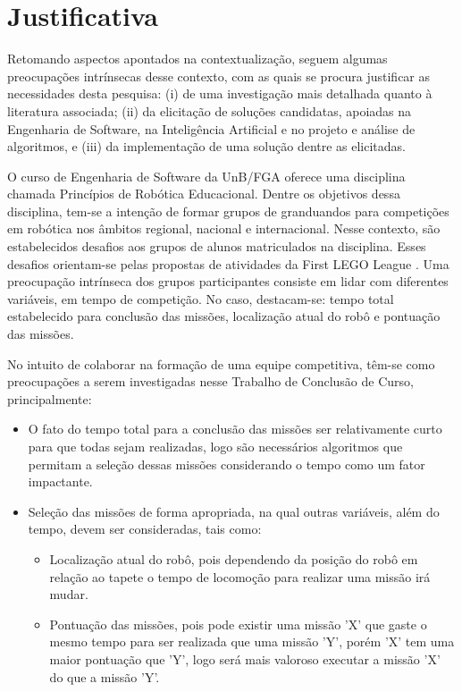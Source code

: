 \section{Justificativa}

Retomando aspectos apontados na contextualização, seguem algumas preocupações intrínsecas desse contexto, com as quais se procura justificar as necessidades desta pesquisa: (i) de uma investigação mais detalhada quanto à literatura associada; (ii) da elicitação de soluções candidatas, apoiadas na Engenharia de Software, na Inteligência Artificial e no projeto e análise de algoritmos, e (iii) da implementação de uma solução dentre as elicitadas.

O curso de Engenharia de Software da UnB/FGA oferece uma disciplina chamada Princípios de Robótica Educacional. Dentre os objetivos dessa disciplina, tem-se a intenção de formar grupos de granduandos para competições em robótica nos âmbitos regional, nacional e internacional. Nesse contexto, são estabelecidos desafios aos grupos de alunos matriculados na disciplina. Esses desafios orientam-se pelas propostas de atividades da First LEGO League \cite{kamenfirst}. Uma preocupação intrínseca dos grupos participantes consiste em lidar com diferentes variáveis, em tempo de competição. No caso, destacam-se: tempo total estabelecido para conclusão das missões, localização atual do robô e pontuação das missões.

No intuito de colaborar na formação de uma equipe competitiva, têm-se como preocupações a serem investigadas nesse Trabalho de Conclusão de Curso, principalmente:

\begin{itemize}
\item O fato do tempo total para a conclusão das missões ser relativamente curto para que todas sejam realizadas, logo são necessários algoritmos que permitam a seleção dessas missões considerando o tempo como um fator impactante.

\item Seleção das missões de forma apropriada, na qual outras variáveis, além do tempo, devem ser consideradas, tais como: 
\begin{itemize}
\item Localização atual do robô, pois dependendo da posição do robô em relação ao tapete o tempo de locomoção para realizar uma missão irá mudar.   
\item Pontuação das missões, pois pode existir uma missão 'X' que gaste o mesmo tempo para ser realizada que uma missão 'Y', porém 'X' tem uma maior pontuação que 'Y', logo será mais valoroso executar a missão 'X' do que a missão 'Y'.
\end{itemize} 
\end{itemize}
 

